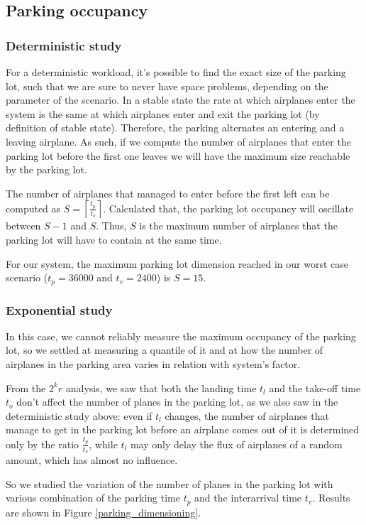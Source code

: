 \documentclass[12pt]{article}
\begin{document}
\subsection{Parking occupancy}

\subsubsection{Deterministic study}
For a deterministic workload, it's possible to find the exact size of the parking lot, such that we are sure to never have space problems, depending on the parameter of the scenario.
In a stable state the rate at which airplanes enter the system is the same at which airplanes enter and exit the parking lot (by definition of stable state). Therefore, the parking alternates an entering and a leaving airplane. As such, if we compute the number of airplanes that enter the parking lot before the first one leaves we will have the maximum size reachable by the parking lot.

The number of airplanes that managed to enter before the first left can be computed as $S=\left\lceil\frac{t_{p}}{t_v}\right\rceil$. Calculated that, the parking lot occupancy will oscillate between $S-1$ and $S$. Thus, $S$ is the maximum number of airplanes that the parking lot will have to contain at the same time. 

For our system, the maximum parking lot dimension reached in our worst case scenario ($t_{p}=36000$ and $t_v=2400$) is $S=15$.

\subsubsection{Exponential study}
In this case, we cannot reliably measure the maximum occupancy of the parking lot, so we settled at measuring a quantile of it and at how the number of airplanes in the parking area varies in relation with system's factor.

From the $2^kr$ analysis, we saw that both the landing time $t_l$ and the take-off time $t_o$ don't affect the number of planes in the parking lot, as we also saw in the deterministic study above: even if $t_l$ changes, the number of airplanes that manage to get in the parking lot before an airplane comes out of it is determined only by the ratio $\frac{t_{p}}{t_v}$, while $t_l$ may only delay the flux of airplanes of a random amount, which has almost no influence.

So we studied the variation of the number of planes in the parking lot with various combination of the parking time $t_p$ and the interarrival time $t_v$.
Results are shown in Figure \ref{parking_dimensioning}.
\end{document}
